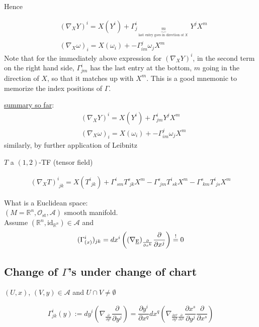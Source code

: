 
Hence

\[
\begin{aligned}
  & ( \nabla_X Y)^i = X(Y^i) + \Gamma^i_{j\underbrace{m}_{\text{ last entry goes in direction of $X$ }} } Y^j X^m \\
  & (\nabla_X \omega)_i = X(\omega_i) + - \Gamma^j_{im} \omega_j X^m
\end{aligned}
\]
Note that for the immediately above expression for $(\nabla_X Y)^i$, in the second term on the right hand side, $\Gamma_{jm}^i$ has the last entry at the bottom, $m$ going in the direction of $X$, so that it matches up with $X^m$. This is a good mnemonic to memorize the index positions of $\Gamma$. 

\underline{summary so far}:
\[
\begin{aligned}
  & ( \nabla_X Y)^i = X(Y^i) + \Gamma^i_{jm }  Y^j X^m \\
  & (\nabla_X \omega)_i = X(\omega_i) + - \Gamma^j_{im} \omega_j X^m
\end{aligned}
\]
similarly, by further application of Leibnitz

$T$ a $(1,2)$-TF (tensor field)

\[
\begin{aligned}
  (\nabla_X T)^i_{ \, \, jk } = X(T^i_{ \, \, jk} ) + \Gamma^i_{ \, \, s m } T^s_{ \, \, jk} X^m - \Gamma^s_{ \, \, jm} T^i_{ \, \, sk} X^m - \Gamma^s_{ \, \, km} T^i_{ \,\, js} X^m
\end{aligned}
\]

What is a Euclidean space: \\
$(M = \mathbb{R}^n, \mathcal{O}_{\text{st}}, \mathcal{A})$ smooth manifold. \\
Assume $(\mathbb{R}^n, \text{id}_{\mathbb{R}^n} ) \in \mathcal{A}$ and 
\[
(\Gamma^i_{(x)})_{jk} = dx^i \left( (\nabla_{\text{\underline{E}}})_{ \frac{ \partial }{ \partial x^k} } \frac{ \partial }{ \partial x^j} \right) \overset{!}{=} 0 
\]


\subsection{Change of $\Gamma$'s under change of chart}

$(U,x)$, $(V,y) \in \mathcal{A}$ and $U \cap V \neq \emptyset$

\[
\Gamma^i_{jk}(y) := dy^i \left( \nabla_{ \frac{ \partial}{ \partial y^k} } \frac{ \partial }{ \partial y^j} \right) = \frac{ \partial y^i}{ \partial x^q }dx^q \left( \nabla_{\frac{ \partial x^p}{ \partial y^k}  \frac{ \partial }{ \partial x^p} } \frac{ \partial x^s}{ \partial y^j} \frac{ \partial }{ \partial x^s } \right)
\]

